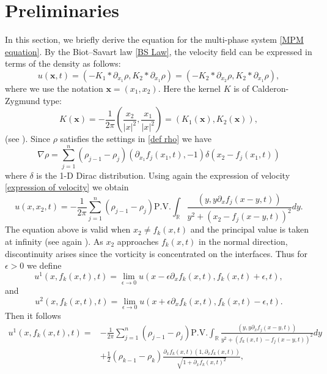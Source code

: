 \documentclass[11pt]{article}
\newcommand{\PV}{\mathrm{P.V.}}
\theoremstyle{definition}
\numberwithin{equation}{section}
\begin{document}
\section{Preliminaries}\label{Preliminaries}
In this section, we briefly derive the equation for the multi-phase system \eqref{MPM equation}. By the Biot--Savart law \eqref{BS Law}, the velocity field can be expressed in terms of the density as follows:
\begin{equation}\label{expression of velocity}
    u(\mathbf{x},t)=(-K_1*\partial_{x_1}\rho,K_2*\partial_{x_1}\rho)=(-K_2*\partial_{x_2}\rho,K_2*\partial_{x_1}\rho),
\end{equation}
where we use the notation $\mathbf{x}=(x_1,x_2)$. Here the kernel $K$ is of Calderon-Zygmund type:
\begin{equation}
    K(\mathbf{x})=-\frac{1}{2\pi}\left(\frac{x_2}{|x|^2},\frac{x_1}{|x|^2}\right)=\left(K_1(\mathbf{x}),K_2(\mathbf{x})\right),
\end{equation}
(see \cite{Stein1993Harmonic}). Since $\rho$ satisfies the settings in \eqref{def rho}
 we have
 \begin{equation}
     \nabla\rho=\sum_{j=1}^n(\rho_{j-1}-\rho_{j})(\partial_{x_1}f_j(x_1,t),-1)\delta(x_2-f_j(x_1,t))
 \end{equation}
 where $\delta$ is the 1-D Dirac distribution. Using again the expression of velocity \eqref{expression of velocity} we obtain
 \begin{equation}\label{singular expression velocity}
     u(x,x_2,t)=-\frac{1}{2\pi}\sum_{j=1}^n(\rho_{j-1}-\rho_j)\PV\int_{\mathbb{R}}\frac{\left(y,y\partial_{x}f_j(x-y,t)\right)}{y^2+\left(x_2-f_j(x-y,t)\right)^2}dy.
 \end{equation}
 The equation above is valid when $x_2\neq f_k(x,t)$ and the principal value is taken at infinity (see again \cite{Stein1993Harmonic}). As $x_2$ approaches $f_k(x,t)$ in the normal direction, discontinuity arises since the vorticity is concentrated on the interfaces. Thus for $\epsilon>0$ we define
 \begin{equation}
         u^1\left(x,f_k(x,t),t\right)=\lim_{\epsilon\rightarrow0}u\left(x-\epsilon\partial_xf_k(x,t),f_k(x,t)+\epsilon,t\right),
     \end{equation}
     and
     \begin{equation}
         u^2\left(x,f_k(x,t),t\right)=\lim_{\epsilon\rightarrow0}u\left(x+\epsilon\partial_xf_k(x,t),f_k(x,t)-\epsilon,t\right).
     \end{equation}
     Then it follows
     \begin{align}
         u^1\left(x,f_k(x,t),t\right)=&-\frac{1}{2\pi}\sum_{j=1}^n(\rho_{j-1}-\rho_j)\PV\int_{\mathbb{R}}\frac{\left(y,y\partial_{x}f_j(x-y,t)\right)}{y^2+\left(f_k(x,t)-f_j(x-y,t)\right)^2}dy\\
         &+\frac{1}{2}(\rho_{k-1}-\rho_k)\frac{\partial_xf_k(x,t)\left(1,\partial_xf_k(x,t)\right)}{\sqrt{1+\partial_xf_k(x,t)^2}},
     \end{align}
\end{document}
